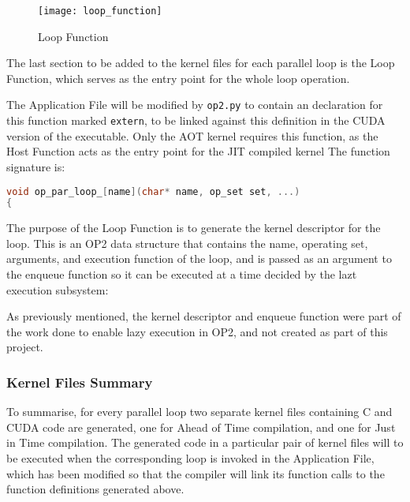 \clearpage

\begin{wrapfigure}{r}{.33\textwidth}
  \centering
  \caption{Loop Function}
  \label{fig:loop_func}
  \texttt{[image: loop\_function]}
\end{wrapfigure}
The last section to be added to the kernel files for each parallel loop is the Loop Function, which serves as the entry point for the whole loop operation.
 \par
The Application File will be modified by \verb|op2.py| to contain an declaration for this function marked \verb|extern|, to be linked against this definition in the CUDA version of the executable. Only the AOT kernel requires this function, as the Host Function acts as the entry point for the JIT compiled kernel The function signature is:
\begin{lstlisting}[backgroundcolor=\color{blue!20}, language=C]
void op_par_loop_[name](char* name, op_set set, ...)
{

\end{lstlisting}
\par
\noindent The purpose of the Loop Function is to generate the kernel descriptor for the loop. This is an OP2 data structure that contains the name, operating set, arguments, and execution function of the loop, and is passed as an argument to the enqueue function so it can be executed at a time decided by the lazt execution subsystem:

\noindent As previously mentioned, the kernel descriptor and enqueue function were part of the work done to enable lazy execution in OP2, and not created as part of this project.

\clearpage

\subsubsection{Kernel Files Summary}
\label{impl_summary}

To summarise, for every parallel loop two separate kernel files containing C and CUDA code are generated, one for Ahead of Time compilation, and one for Just in Time compilation. The generated code in a particular pair of kernel files will to be executed when the corresponding loop is invoked in the Application File, which has been modified so that the compiler will link its function calls to the function definitions generated above.

